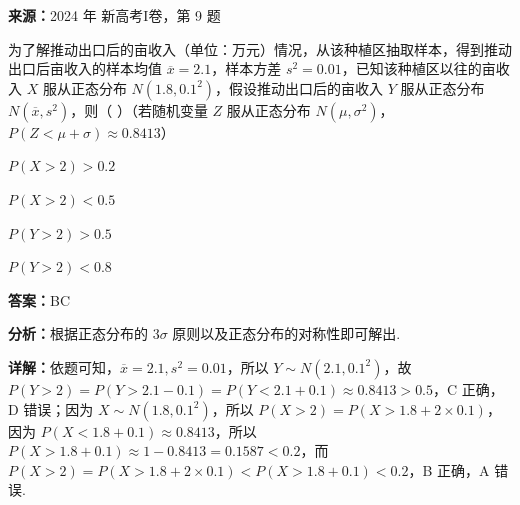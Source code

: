 \begin{question}[points=6]
\textbf{来源：}2024 年 新高考I卷，第 9 题\par
为了解推动出口后的亩收入（单位：万元）情况，从该种植区抽取样本，得到推动出口后亩收入的样本均值 $\overline{x}=2.1$，样本方差 $s^2=0.01$，已知该种植区以往的亩收入 $X$ 服从正态分布 $N(1.8,0.1^2)$，假设推动出口后的亩收入 $Y$ 服从正态分布 $N(\overline{x},s^2)$，则（ ）（若随机变量 $Z$ 服从正态分布 $N(\mu,\sigma^2)$，$P(Z<\mu+\sigma)\approx 0.8413$）
\begin{choices}
  \item $P(X>2)>0.2$
  \item $P(X>2)<0.5$
  \item $P(Y>2)>0.5$
  \item $P(Y>2)<0.8$
\end{choices}
\begin{solution}
\textbf{答案：}BC

\textbf{分析：}根据正态分布的 $3\sigma$ 原则以及正态分布的对称性即可解出.

\textbf{详解：}依题可知，$\overline{x}=2.1, s^2=0.01$，所以 $Y\sim N(2.1,0.1^2)$，故 $P(Y>2)=P(Y>2.1-0.1)=P(Y<2.1+0.1)\approx 0.8413>0.5$，C 正确，D 错误；因为 $X\sim N(1.8,0.1^2)$，所以 $P(X>2)=P(X>1.8+2\times0.1)$，因为 $P(X<1.8+0.1)\approx 0.8413$，所以 $P(X>1.8+0.1)\approx 1-0.8413=0.1587<0.2$，而 $P(X>2)=P(X>1.8+2\times0.1)<P(X>1.8+0.1)<0.2$，B 正确，A 错误.
\end{solution}
\end{question}


